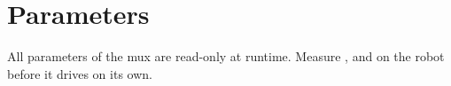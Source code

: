 \section{Parameters}

All parameters of the mux are read-only at runtime. Measure ,
 and  on the robot before it drives on its own.


